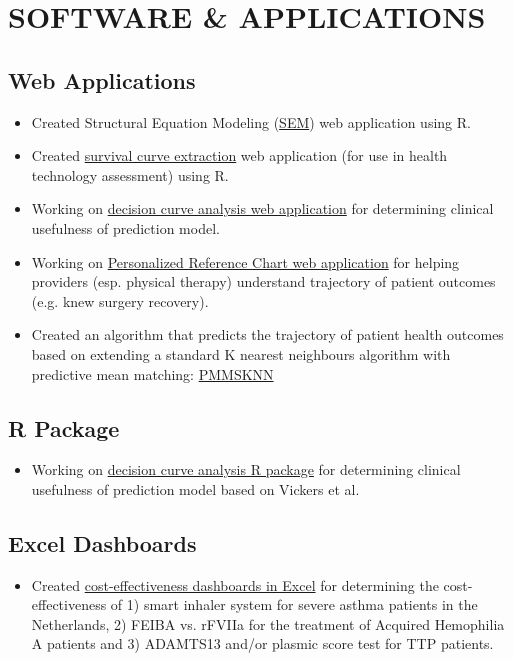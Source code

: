\documentclass[paper=a4,fontsize=11pt]{scrartcl} %
\newcommand{\NewPart}[1]{\section*{\uppercase{#1}}}
\begin{document}
\NewPart{Software \& Applications}{}
\subsection*{Web Applications}
\begin{itemize}
    \setlength\itemsep{0em}
    \item Created Structural Equation Modeling (\href{https://www.shinyapps.io/admin/#/application/232542}{SEM}) web application using R. 
    \item Created \href{https://github.com/ck2136/SurvivalCurveExtraction}{survival curve extraction} web application (for use in health technology assessment) using R.
    \item Working on \href{https://github.com/ck2136/DecisionCurve}{decision curve analysis web application} for determining clinical usefulness of prediction model.
    \item Working on \href{https://github.com/ck2136/pcr}{Personalized Reference Chart web application} for helping providers (esp. physical therapy) understand trajectory of patient outcomes (e.g. knew surgery recovery).
    \item Created an algorithm that predicts the trajectory of patient health outcomes based on extending a standard K nearest neighbours algorithm with predictive mean matching:  \href{https://github.com/ck2136/PMMSKNN}{PMMSKNN}
\end{itemize}

\subsection*{R Package}
\begin{itemize}
    \item Working on \href{https://github.com/ck2136/DecisionCurve}{decision curve analysis R package} for determining clinical usefulness of prediction model based on Vickers et al.
\end{itemize}

\subsection*{Excel Dashboards}
\begin{itemize}
    \item Created \href{https://github.com/ck2136/FEIBAvsrFIIa/tree/master/Code}{cost-effectiveness dashboards in Excel} for determining the cost-effectiveness of 1) smart inhaler system for severe asthma patients in the Netherlands, 2) FEIBA vs. rFVIIa for the treatment of Acquired Hemophilia A patients and 3) ADAMTS13 and/or plasmic score test for TTP patients. 
\end{itemize}
\end{document}
